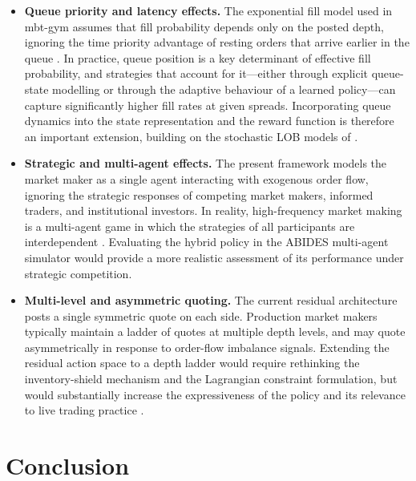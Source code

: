 \documentclass[11pt]{article}
\begin{document}
\begin{itemize}[leftmargin=*, itemsep=6pt]
  \item \textbf{Queue priority and latency effects.}
    The exponential fill model used in mbt-gym assumes that fill
    probability depends only on the posted depth, ignoring the time
    priority advantage of resting orders that arrive earlier in the
    queue \parencite{cont2013markovlob}.
    In practice, queue position is a key determinant of effective fill
    probability, and strategies that account for it---either through
    explicit queue-state modelling or through the adaptive behaviour of
    a learned policy---can capture significantly higher fill rates at
    given spreads.
    Incorporating queue dynamics into the state representation and the
    reward function is therefore an important extension, building on the
    stochastic LOB models of \textcite{cont2010stochastic}.

  \item \textbf{Strategic and multi-agent effects.}
    The present framework models the market maker as a single agent
    interacting with exogenous order flow, ignoring the strategic
    responses of competing market makers, informed traders, and
    institutional investors.
    In reality, high-frequency market making is a multi-agent game in
    which the strategies of all participants are interdependent
    \parencite{menkveld2013high,kyle1985continuous,glosten1985bid}.
    Evaluating the hybrid policy in the ABIDES multi-agent simulator
    \parencite{byrd2019abides,karpe2020marl} would provide a more
    realistic assessment of its performance under strategic competition.

  \item \textbf{Multi-level and asymmetric quoting.}
    The current residual architecture posts a single symmetric quote on
    each side.
    Production market makers typically maintain a ladder of quotes at
    multiple depth levels, and may quote asymmetrically in response to
    order-flow imbalance signals.
    Extending the residual action space to a depth ladder would require
    rethinking the inventory-shield mechanism and the Lagrangian
    constraint formulation, but would substantially increase the
    expressiveness of the policy and its relevance to live trading
    practice \parencite{cartea2015ahft,guilbaud2013optimal}.
\end{itemize}

\section{Conclusion}
\label{sec:conclusion}
\end{document}
